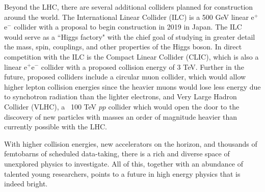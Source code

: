 Beyond the LHC, there are several additional colliders planned for construction around the world. The International Linear Collider (ILC) is a 500 GeV linear e$^+$e$^-$ collider with a proposal to begin construction in 2019 in Japan. The ILC would serve as a ``Higgs factory" with the chief goal of studying in greater detail the mass, spin, couplings, and other properties of the Higgs boson. In direct competition with the ILC is the Compact Linear Collider (CLIC), which is also a linear e$^+$e$^-$ collider with a proposed collision energy of 3 TeV. Further in the future, proposed colliders include a circular muon collider, which would allow higher lepton collision energies since the heavier muons would lose less energy due to synchotron radiation than the lighter electrons, and Very Large Hadron Collider (VLHC), a ~100 TeV $pp$ collider which would open the door to the discovery of new particles with masses an order of magnitude heavier than currently possible with the LHC.

With higher collision energies, new accelerators on the horizon, and thousands of femtobarns of scheduled data-taking, there is a rich and diverse space of unexplored physics to investigate. All of this, together with an abundance of talented young researchers, points to a future in high energy physics that is indeed bright.